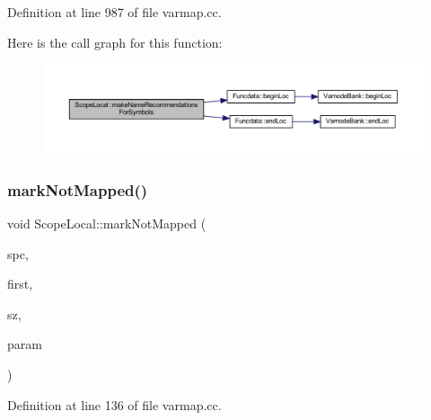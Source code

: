 Definition at line 987 of file varmap.\+cc.

Here is the call graph for this function\+:
\nopagebreak
\begin{figure}[H]
\begin{center}
\leavevmode
\includegraphics[width=350pt]{class_scope_local_ae812b32473e4de47b9072370b75de94c_cgraph}
\end{center}
\end{figure}
\mbox{\label{class_scope_local_a560ea5441b79ef3c17b890c7d37ccaf1}} 
\subsubsection{\texorpdfstring{markNotMapped()}{markNotMapped()}}
{\footnotesize\ttfamily void Scope\+Local\+::mark\+Not\+Mapped (\begin{DoxyParamCaption}\item[{\mbox{\hyperlink{class_addr_space}{Addr\+Space}} $\ast$}]{spc,  }\item[{\mbox{\hyperlink{types_8h_a2db313c5d32a12b01d26ac9b3bca178f}{uintb}}}]{first,  }\item[{int4}]{sz,  }\item[{bool}]{param }\end{DoxyParamCaption})}



Definition at line 136 of file varmap.\+cc.

